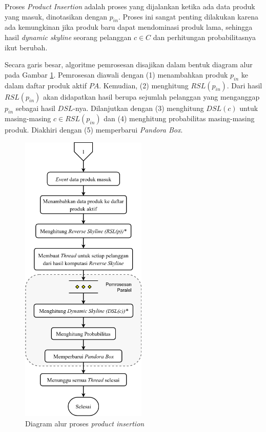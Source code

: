 
Proses \textit{Product Insertion} adalah proses yang dijalankan ketika ada data produk yang masuk, dinotasikan dengan $p_{in}$. Proses ini sangat penting dilakukan karena ada kemungkinan jika produk baru dapat mendominasi produk lama, sehingga hasil \textit{dynamic skyline} seorang pelanggan $c \in C$ dan perhitungan probabilitasnya ikut berubah. 

Secara garis besar, algoritme pemrosesan disajikan dalam bentuk diagram alur pada Gambar \ref{fig:flowchart-pi}. Pemrosesan diawali dengan (1) menambahkan produk $p_{in}$ ke dalam daftar produk aktif $PA$. Kemudian, (2) menghitung $RSL(p_{in})$. Dari hasil $RSL(p_{in})$ akan didapatkan hasil berupa sejumlah pelanggan yang menganggap $p_{in}$ sebagai hasil $DSL$-nya. Dilanjutkan dengan (3) menghitung $DSL(c)$ untuk masing-masing $c \in RSL(p_{in})$ dan (4) menghitung probabilitas masing-masing produk. Diakhiri dengan (5) memperbarui \textit{Pandora Box}. 

\begin{figure}[H]
	\centering
	\includegraphics[width=6cm]{assets/img/bab3/flowchart-pi.png}
	\caption{Diagram alur proses \textit{product insertion}}
	\label{fig:flowchart-pi}
\end{figure}

